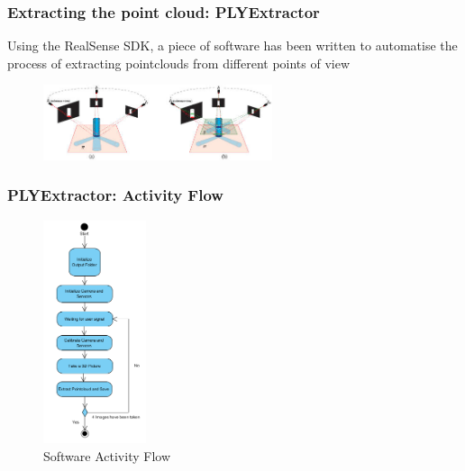 \documentclass{beamer}
\begin{document}

\begin{frame}\frametitle{Extracting the point cloud: PLYExtractor}

Using the RealSense SDK, a piece of software has been written to automatise the process of extracting pointclouds from different points of view 

\begin{figure}	
\includegraphics[width=0.6\textwidth]{Figures/Resear10.jpg}
\label{fig:Reco}
\end{figure}

\end{frame}

\begin{frame}\frametitle{PLYExtractor: Activity Flow}

\begin{figure}	
\includegraphics[width=0.27\textwidth]{Figures/ActvityFlow.PNG}
\caption{Software Activity Flow}
\label{fig:ActivityFlow}
\end{figure}


\end{frame}
\end{document}
